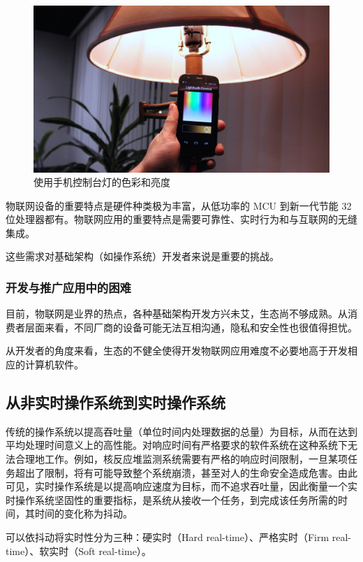 \documentclass{ctexart}
\begin{document}
\begin{figure}
	\centering
	\includegraphics[scale=0.27]{Lightbulb.jpg}
	\caption{使用手机控制台灯的色彩和亮度}
\end{figure}

物联网设备的重要特点是硬件种类极为丰富，从低功率的 MCU 到新一代节能 32 位处理器都有。物联网应用的重要特点是需要可靠性、实时行为和与互联网的无缝集成。

这些需求对基础架构（如操作系统）开发者来说是重要的挑战。

\subsubsection{开发与推广应用中的困难}

目前，物联网是业界的热点，各种基础架构开发方兴未艾，生态尚不够成熟。从消费者层面来看，不同厂商的设备可能无法互相沟通，隐私和安全性也很值得担忧。

从开发者的角度来看，生态的不健全使得开发物联网应用难度不必要地高于开发相应的计算机软件。

\subsection{从非实时操作系统到实时操作系统}

传统的操作系统以提高吞吐量（单位时间内处理数据的总量）为目标，从而在达到平均处理时间意义上的高性能。对响应时间有严格要求的软件系统在这种系统下无法合理地工作。例如，核反应堆监测系统需要有严格的响应时间限制，一旦某项任务超出了限制，将有可能导致整个系统崩溃，甚至对人的生命安全造成危害。由此可见，实时操作系统是以提高响应速度为目标，而不追求吞吐量，因此衡量一个实时操作系统坚固性的重要指标，是系统从接收一个任务，到完成该任务所需的时间，其时间的变化称为抖动。

可以依抖动将实时性分为三种：硬实时（Hard real-time）、严格实时（Firm real-time）、软实时（Soft real-time）。
\end{document}
